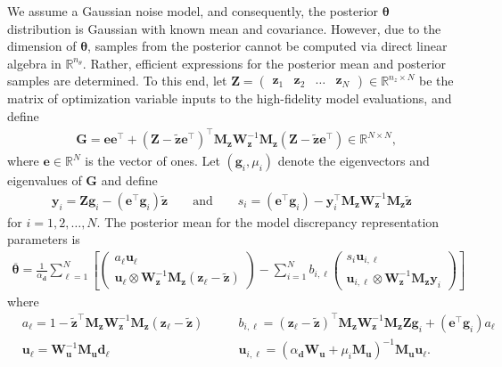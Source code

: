 \documentclass[11pt]{article}
\renewcommand{\vec}[1] {\boldsymbol{#1}}
\newcommand{\R}{\mathbb{R}}
\renewcommand{\u}{\bm{u}}
\renewcommand{\t}{\bm{\theta}}
\newcommand{\z}{\bm{z}}
\newcommand{\0}{\bm{0}}
\newcommand{\M}{\bm{M}}
\newcommand{\W}{\bm{W}}
\newcommand{\G}{\bm{G}}
\newcommand{\e}{\bm{e}}
\newcommand{\ztilde}{\tilde{\z}}
\begin{document}
We assume a Gaussian noise model, and consequently, the posterior $\t$ distribution is Gaussian with known mean and covariance. However, due to the dimension of $\t$, samples from the posterior cannot be computed via direct linear algebra in $\R^{n_\theta}$. Rather, efficient expressions for the posterior mean and posterior samples are determined. To this end, let $\vec{Z} = \begin{pmatrix} \z_1 & \z_2 & \dots & \z_N \end{pmatrix} \in \R^{n_z \times N}$ be the matrix of optimization variable inputs to the high-fidelity model evaluations, and define 
\begin{align*}
& \G= \e \e^\top + (\vec{Z} - \ztilde \e^\top)^\top \M_{\z} \W_{\z}^{-1} \M_{\z} (\vec{Z}-\ztilde \e^\top) \in \R^{N \times N},
\end{align*}
where $\e \in \R^N$ is the vector of ones. Let $(\vec{g}_i,\mu_i)$ denote the eigenvectors and eigenvalues of $\vec{G}$ and define
\begin{eqnarray}
\vec{y}_i = \vec{Z} \vec{g}_i - (\e^\top \vec{g}_i) \ztilde \qquad \text{and} \qquad s_i = (\e^\top \vec{g}_i) - \vec{y}_i^\top  \M_{\z} \W_{\z}^{-1}  \M_{\z} \ztilde 
\end{eqnarray}
for $i=1,2,\dots,N$. The posterior mean for the model discrepancy representation parameters is
\begin{eqnarray*}
\overline{\t} = \frac{1}{\alpha_{\vec{d}}} \sum\limits_{\ell=1}^N 
\left[
\left(
\begin{array}{c}
a_\ell \u_\ell \\
 \u_\ell  \otimes   \W_{\z}^{-1}  \M_{\z} (\z_\ell-\ztilde) 
 \end{array}
\right)
-
\sum\limits_{i=1}^N b_{i,\ell}
\left(
\begin{array}{c}
s_i \vec{u}_{i,\ell} \\
 \vec{u}_{i,\ell} \otimes   \W_{\z}^{-1}  \M_{\z} \vec{y}_i 
\end{array}
\right)
\right]
\end{eqnarray*}
where
\begin{align*}
& a_{\ell} = 1-\ztilde^\top  \M_{\z} \W_{\z}^{-1} \M_{\z} (\z_\ell-\ztilde) \qquad  & b_{i,\ell} = (\z_\ell-\ztilde)^\top  \M_{\z}\W_{\z}^{-1}  \M_{\z} \vec{Z} \vec{g}_i + (\e^\top \vec{g}_i) a_\ell \\
& \vec{u}_\ell = \W_{\u}^{-1} \M_{\u} \vec{d}_\ell & \vec{u}_{i,\ell} = \left( \alpha_{\vec{d}} \W_{\u} + \mu_i \M_{\u} \right)^{-1} \M_{\u} \u_\ell .
\end{align*}
\end{document}
